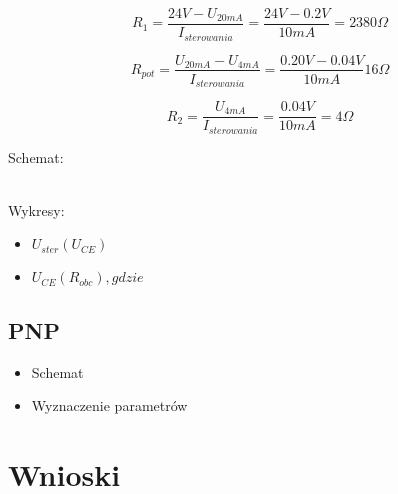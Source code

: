 \documentclass{article}
\begin{document}
$$
    R_{1} = \frac{24V - U_{20mA}}{I_{sterowania}}=\frac{24V - 0.2V}{10mA} = 2380 \Omega
$$

$$
    R_{pot} = \frac{U_{20mA} - U_{4mA}}{I_{sterowania}} = 
    \frac{0.20V-0.04V}{10mA} 16\Omega
$$


$$
    R_{2} = \frac{U_{4mA}}{I_{sterowania}} = \frac{0.04V}{10mA} = 4 \Omega
$$

Schemat:


\\

Wykresy:

\begin{itemize}
    \item $U_{ster}(U_{CE})$
    \item $U_{CE}(R_{obc}), gdzie $
\end{itemize}

\subsection{PNP}

\begin{itemize}
    \item Schemat
    \item Wyznaczenie parametrów
\end{itemize}

\section{Wnioski}
\end{document}

